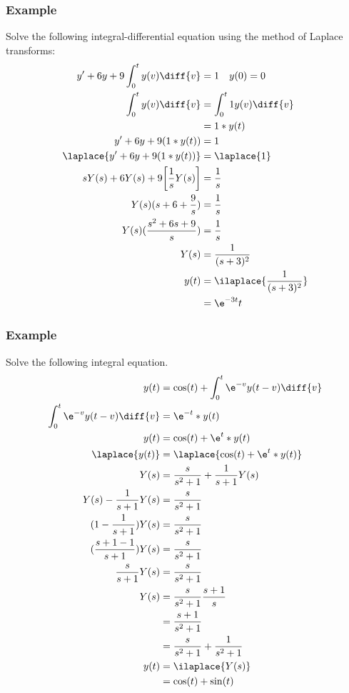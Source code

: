\documentclass{math}
\begin{document}
\subsubsection*{Example}
Solve the following integral-differential equation using the method of Laplace
transforms:
\begin{align*}
  y'+6y+9\int_{0}^{t}y(v)\diff{v} &= 1 \quad y(0) = 0 \\
  \int_{0}^{t}y(v)\diff{v} &= \int_{0}^{t}1y(v)\diff{v} \\
  &= 1*y(t) \\
  y'+6y+9(1*y(t)) &= 1 \\
  \laplace{y'+6y+9(1*y(t))} &= \laplace{1} \\
  sY(s)+6Y(s)+9\bigg[\frac{1}{s}Y(s)\bigg] &= \frac{1}{s} \\
  Y(s)(s+6+\frac{9}{s}) &= \frac{1}{s} \\
  Y(s)(\frac{s^2+6s+9}{s}) &= \frac{1}{s} \\
  Y(s) &= \frac{1}{(s+3)^2} \\
  y(t) &= \ilaplace{\frac{1}{(s+3)^2}} \\
  &= \e^{-3t}t
\end{align*}

\subsubsection*{Example}
Solve the following integral equation.
\begin{align*}
  y(t) &= \cos(t)+\int_{0}^{t}\e^{-v}y(t-v)\diff{v} \\
  \int_{0}^{t}\e^{-v}y(t-v)\diff{v} &= \e^{-t}*y(t) \\
  y(t) &= \cos(t)+\e^{t}*y(t) \\
  \laplace{y(t)} &= \laplace{\cos(t)+\e^{t}*y(t)} \\
  Y(s) &= \frac{s}{s^2+1}+\frac{1}{s+1}Y(s) \\
  Y(s)-\frac{1}{s+1}Y(s) &= \frac{s}{s^2+1} \\
  (1-\frac{1}{s+1})Y(s) &= \frac{s}{s^2+1} \\
  (\frac{s+1-1}{s+1})Y(s) &= \frac{s}{s^2+1} \\
  \frac{s}{s+1}Y(s) &= \frac{s}{s^2+1} \\
  Y(s) &= \frac{s}{s^2+1}\frac{s+1}{s} \\
  &= \frac{s+1}{s^2+1} \\
  &= \frac{s}{s^2+1}+\frac{1}{s^2+1} \\
  y(t) &= \ilaplace{Y(s)} \\
  &= \cos(t)+\sin(t)
\end{align*}
\end{document}
